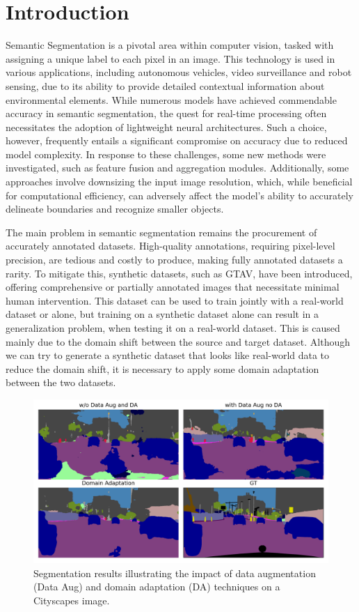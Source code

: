 \documentclass[conference]{IEEEtran}
\begin{document}
\section{Introduction}
Semantic Segmentation is a pivotal area within computer vision, tasked with assigning a unique label to each pixel in an image. This technology is used in various applications, including autonomous vehicles, video surveillance and robot sensing, due to its ability to provide detailed contextual information about environmental elements. While numerous models have achieved commendable accuracy in semantic segmentation, the quest for real-time processing often necessitates the adoption of lightweight neural architectures. Such a choice, however, frequently entails a significant compromise on accuracy due to reduced model complexity.
In response to these challenges, some new methods were investigated, such as feature fusion and aggregation modules. Additionally, some approaches involve downsizing the input image resolution, which, while beneficial for computational efficiency, can adversely affect the model's ability to accurately delineate boundaries and recognize smaller objects.

The main problem in semantic segmentation remains the procurement of accurately annotated datasets. High-quality annotations, requiring pixel-level precision, are tedious and costly to produce, making fully annotated datasets a rarity. To mitigate this, synthetic datasets, such as GTAV, have been introduced, offering comprehensive or partially annotated images that necessitate minimal human intervention. This dataset can be used to train jointly with a real-world dataset or alone, but training on a synthetic dataset alone can result in a generalization problem, when testing it on a real-world dataset. This is caused mainly due to the domain shift between the source and target dataset. Although we can try to generate a synthetic dataset that looks like real-world data to reduce the domain shift, it is necessary to apply some domain adaptation between the two datasets.
\begin{figure}[!t]
\centering
\includegraphics[width=\linewidth]{figures/small.png}
\caption{Segmentation results illustrating the impact of data augmentation (Data Aug) and domain adaptation (DA) techniques on a Cityscapes image.}
\end{figure}
\end{document}
